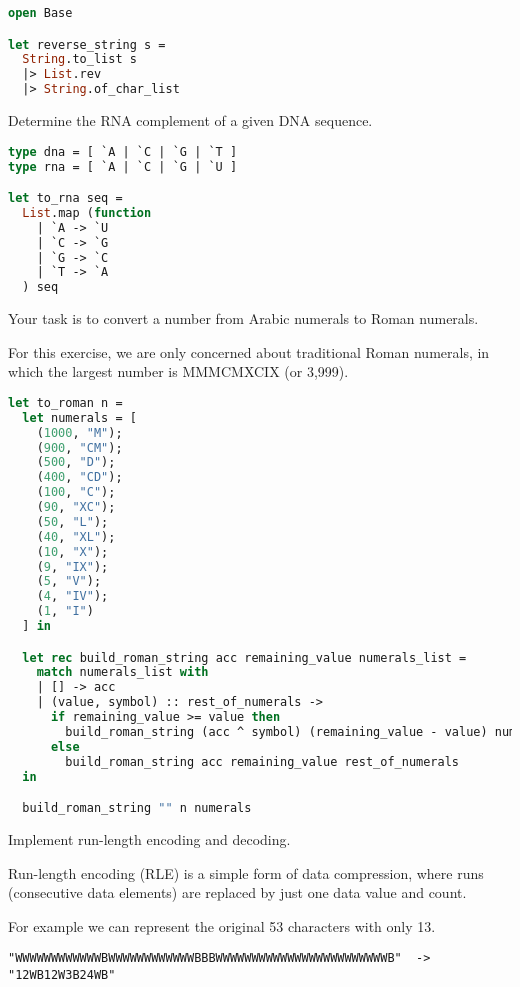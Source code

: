 \begin{lstlisting}[language=OCaml]
open Base

let reverse_string s =
  String.to_list s 
  |> List.rev 
  |> String.of_char_list
\end{lstlisting}

Determine the RNA complement of a given DNA sequence.

\begin{lstlisting}[language=OCaml]
type dna = [ `A | `C | `G | `T ]
type rna = [ `A | `C | `G | `U ]

let to_rna seq =
  List.map (function
  	| `A -> `U
    | `C -> `G
    | `G -> `C
    | `T -> `A
  ) seq
\end{lstlisting}

Your task is to convert a number from Arabic numerals to Roman numerals.

For this exercise, we are only concerned about traditional Roman numerals, in which the largest number is MMMCMXCIX (or 3,999).

\begin{lstlisting}[language=OCaml]
let to_roman n =
  let numerals = [
    (1000, "M");
    (900, "CM");
    (500, "D");
    (400, "CD");
    (100, "C");
    (90, "XC");
    (50, "L");
    (40, "XL");
    (10, "X");
    (9, "IX");
    (5, "V");
    (4, "IV");
    (1, "I")
  ] in

  let rec build_roman_string acc remaining_value numerals_list =
    match numerals_list with
    | [] -> acc
    | (value, symbol) :: rest_of_numerals ->
      if remaining_value >= value then
        build_roman_string (acc ^ symbol) (remaining_value - value) numerals_list
      else
        build_roman_string acc remaining_value rest_of_numerals
  in

  build_roman_string "" n numerals
\end{lstlisting}

Implement run-length encoding and decoding.

Run-length encoding (RLE) is a simple form of data compression, where runs (consecutive data elements) are replaced by just one data value and count.

For example we can represent the original 53 characters with only 13.

\begin{verbatim}
"WWWWWWWWWWWWBWWWWWWWWWWWWBBBWWWWWWWWWWWWWWWWWWWWWWWWB"  ->  "12WB12W3B24WB"
\end{verbatim}

